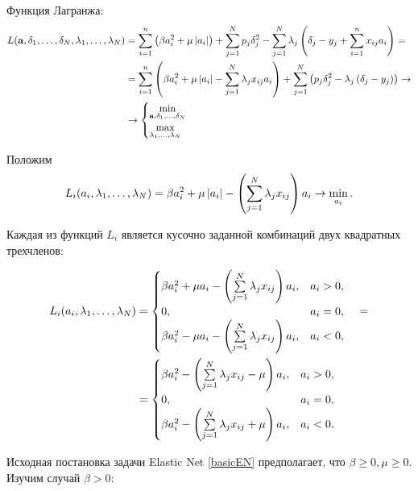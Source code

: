 Функция Лагранжа:
\begin{equation}
	\label{LagrWEN}
	\begin{split}
		L(\boldsymbol{\mathbf{a}},\delta_{1},\ldots,\delta_{N}, \lambda_{1},\ldots,\lambda_{N}) 
	&= \sum\limits_{i=1}^n\left(\beta a_i^2 + \mu \left|a_i\right|\right) + \sum\limits_{j=1}^N p_j\delta_j^2 - \sum_{j=1}^N\lambda_j\left(\delta_j - y_j + \sum\limits_{i=1}^nx_{ij}a_i\right) = \\
	&= \sum\limits_{i=1}^n\left(\beta a_i^2 + \mu \left|a_i\right| - \sum\limits_{j=1}^N\lambda_jx_{ij}a_i\right) + \sum\limits_{j=1}^N \left(p_j\delta_j^2  - \lambda_j\left(\delta_j - y_j\right)\right) \to \\
	&\to 
	\begin{cases}
		\mathop{\mbox{min}}\limits_{\boldsymbol{\mathbf{a}},\delta_{1},\ldots,\delta_{N}}\\
		\mathop{\mbox{max}}\limits_{\lambda_{1},\ldots,\lambda_{N}}\\
	\end{cases}
	\end{split}
\end{equation}

Положим 
\begin{equation}
	\label{partialLagr}
	L_i(a_i,\lambda_{1},\ldots,\lambda_{N}) = \beta a_i^2 + \mu \left|a_i\right| - \left(\sum\limits_{j=1}^N\lambda_jx_{ij}\right)a_i \to \mathop{\mbox{min}}\limits_{a_i}.
\end{equation}

Каждая из функций $L_i$ является кусочно заданной комбинаций двух квадратных трехчленов:

\begin{equation}
	\label{partialLagrParted}
	\begin{split}
		L_i(a_i,\lambda_{1},\ldots,\lambda_{N}) 
		&= \begin{cases}
			\beta a_i^2 + \mu a_i - \left(\sum\limits_{j=1}^N\lambda_jx_{ij}\right)a_i, &a_i > 0,\\
			0, &a_i = 0,\\
			\beta a_i^2 - \mu a_i - \left(\sum\limits_{j=1}^N\lambda_jx_{ij}\right)a_i, &a_i < 0,\\
		\end{cases} \quad= \\
		&= \begin{cases}
			\beta a_i^2 - \left(\sum\limits_{j=1}^N\lambda_jx_{ij}-\mu\right)a_i, &a_i > 0,\\
			0, &a_i = 0,\\
			\beta a_i^2 - \left(\sum\limits_{j=1}^N\lambda_jx_{ij}+\mu\right)a_i, &a_i < 0.\\
		\end{cases}	
	\end{split}
\end{equation}

Исходная постановка задачи Elastic Net \ref{basicEN} предполагает, что $\beta\ge0, \mu\ge0.$ Изучим случай $\beta > 0:$ 

